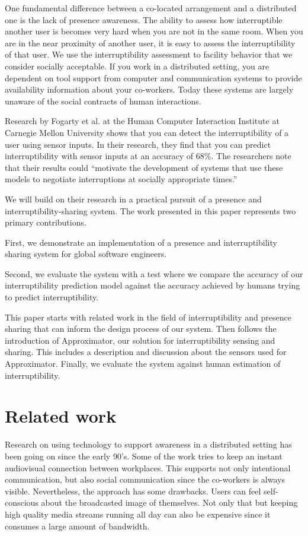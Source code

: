 \documentclass{sigchi}
\begin{document}
One fundamental difference between a co-located arrangement and a distributed one is the lack of presence awareness.
The ability to assess how interruptible another user is becomes very hard when you are not in the same room.
When you are in the near proximity of another user, it is easy to assess the interruptibility of that user.
We use the interruptibility assessment to facility behavior that we consider socially acceptable.
If you work in a distributed setting, you are dependent on tool support from computer and communication systems to provide availability information about your co-workers.
Today these systems are largely unaware of the social contracts of human interactions.

Research by Fogarty et al. at the Human Computer Interaction Institute at Carnegie Mellon University \cite{fogarty2005predicting} shows that you can detect the interruptibility of a user using sensor inputs.
In their research, they find that you can predict interruptibility with sensor inputs at an accuracy of 68\%.
The researchers note that their results could ``motivate the development of systems that use these models to negotiate interruptions at socially appropriate times.''

We will build on their research in a practical pursuit of a presence and interruptibility-sharing system.
The work presented in this paper represents two primary contributions.

First, we demonstrate an implementation of a presence and interruptibility sharing system for global software engineers.

Second, we evaluate the system with a test where we compare the accuracy of our interruptibility prediction model against the accuracy achieved by humans trying to predict interruptibility.

This paper starts with related work in the field of interruptibility and presence sharing that can inform the design process of our system.
Then follows the introduction of Approximator, our solution for interruptibility sensing and sharing.
This includes a description and discussion about the sensors used for Approximator.
Finally, we evaluate the system against human estimation of interruptibility.

\section{Related work}
Research on using technology to support awareness in a distributed setting has been going on since the early 90's.
Some of the work \cite{bly1993media} \cite{gaver1992realizing} \cite{mantei1991experiences} tries to keep an instant audiovisual connection between workplaces.
This supports not only intentional communication, but also social communication since the co-workers is always visible.
Nevertheless, the approach has some drawbacks.
Users can feel self-conscious about the broadcasted image of themselves.
Not only that but keeping high quality media streams running all day can also be expensive since it consumes a large amount of bandwidth.
\end{document}
